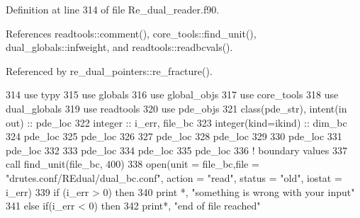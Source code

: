Definition at line 314 of file Re\+\_\+dual\+\_\+reader.\+f90.



References readtools\+::comment(), core\+\_\+tools\+::find\+\_\+unit(), dual\+\_\+globals\+::infweight, and readtools\+::readbcvals().



Referenced by re\+\_\+dual\+\_\+pointers\+::re\+\_\+fracture().


\begin{DoxyCode}
314       \textcolor{keywordtype}{use }typy
315       \textcolor{keywordtype}{use }globals
316       \textcolor{keywordtype}{use }global_objs
317       \textcolor{keywordtype}{use }core_tools
318       \textcolor{keywordtype}{use }dual_globals
319       \textcolor{keywordtype}{use }readtools
320       \textcolor{keywordtype}{use }pde_objs
321       \textcolor{keywordtype}{class}(pde_str), \textcolor{keywordtype}{intent(in out)} :: pde\_loc
322       \textcolor{keywordtype}{integer} :: i\_err, file\_bc
323       \textcolor{keywordtype}{integer(kind=ikind)} :: dim\_bc
324       pde\_loc%
325       pde\_loc%
326 
327       pde\_loc%
328       pde\_loc%
329 
330       pde\_loc%
331       pde\_loc%
332 
333       pde\_loc%
334       pde\_loc%
335       pde\_loc%
336     \textcolor{comment}{! boundary values}
337       \textcolor{keyword}{call }find_unit(file\_bc, 400)
338       \textcolor{keyword}{open}(unit = file\_bc,file = \textcolor{stringliteral}{"drutes.conf/REdual/dual\_bc.conf"}, action\textcolor{comment}{ = }\textcolor{stringliteral}{"read"}\textcolor{comment}{, status = }\textcolor{stringliteral}{"old"}\textcolor{comment}{, iostat
       = i\_err)}
339 \textcolor{comment}{      }\textcolor{keywordflow}{if} (i\_err > 0) \textcolor{keywordflow}{then}
340         print *, \textcolor{stringliteral}{"something is wrong with your input"}
341       \textcolor{keywordflow}{else} \textcolor{keywordflow}{if}(i\_err < 0) \textcolor{keywordflow}{then}
342         print*, \textcolor{stringliteral}{"end of file reached"}

\end{DoxyCode}
